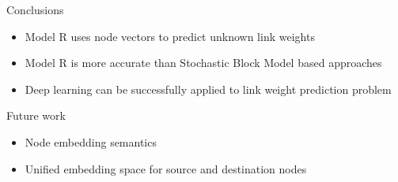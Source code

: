 \documentclass{beamer}
\begin{document}
\begin{frame}{Conclusions}
	\begin{itemize}
		\item Model R uses node vectors to predict unknown link weights
		\item Model R is more accurate than Stochastic Block Model based approaches
		\item Deep learning can be successfully applied to link weight prediction problem
	\end{itemize}
\end{frame}

\begin{frame}{Future work}
	\begin{itemize}
		\item Node embedding semantics
		\item Unified embedding space for source and destination nodes
	\end{itemize}
\end{frame}
\end{document}
